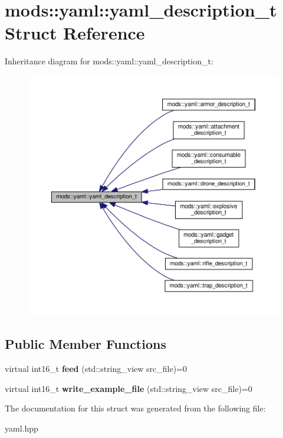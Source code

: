 \hypertarget{structmods_1_1yaml_1_1yaml__description__t}{}\section{mods\+:\+:yaml\+:\+:yaml\+\_\+description\+\_\+t Struct Reference}
\label{structmods_1_1yaml_1_1yaml__description__t}


Inheritance diagram for mods\+:\+:yaml\+:\+:yaml\+\_\+description\+\_\+t\+:\nopagebreak
\begin{figure}[H]
\begin{center}
\leavevmode
\includegraphics[width=350pt]{structmods_1_1yaml_1_1yaml__description__t__inherit__graph}
\end{center}
\end{figure}
\subsection*{Public Member Functions}
\begin{DoxyCompactItemize}
\item 
\mbox{\label{structmods_1_1yaml_1_1yaml__description__t_a41d8c86bfa7033739e0ce46ec18822b9}} 
virtual int16\+\_\+t {\bfseries feed} (std\+::string\+\_\+view src\+\_\+file)=0
\item 
\mbox{\label{structmods_1_1yaml_1_1yaml__description__t_a8e8598ee352c7ddf6ddae48955907537}} 
virtual int16\+\_\+t {\bfseries write\+\_\+example\+\_\+file} (std\+::string\+\_\+view src\+\_\+file)=0
\end{DoxyCompactItemize}


The documentation for this struct was generated from the following file\+:\begin{DoxyCompactItemize}
\item 
yaml.\+hpp\end{DoxyCompactItemize}
